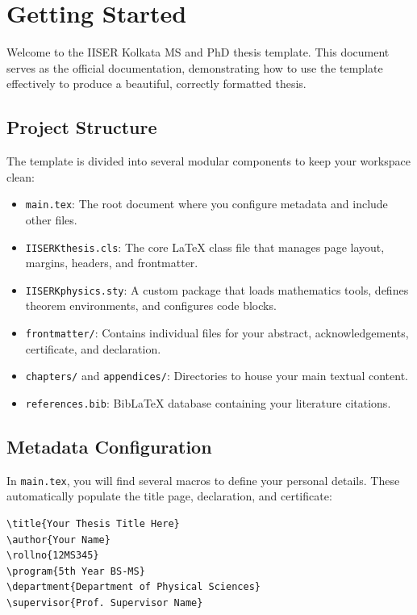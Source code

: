 \chapter{Getting Started}
\label{ch:getting_started}

Welcome to the IISER Kolkata MS and PhD thesis template. This document serves as the official documentation, demonstrating how to use the template effectively to produce a beautiful, correctly formatted thesis.

\section{Project Structure}
The template is divided into several modular components to keep your workspace clean:
\begin{itemize}
    \item \texttt{main.tex}: The root document where you configure metadata and include other files.
    \item \texttt{IISERKthesis.cls}: The core LaTeX class file that manages page layout, margins, headers, and frontmatter.
    \item \texttt{IISERKphysics.sty}: A custom package that loads mathematics tools, defines theorem environments, and configures code blocks.
    \item \texttt{frontmatter/}: Contains individual files for your abstract, acknowledgements, certificate, and declaration.
    \item \texttt{chapters/} and \texttt{appendices/}: Directories to house your main textual content.
    \item \texttt{references.bib}: BibLaTeX database containing your literature citations.
\end{itemize}

\section{Metadata Configuration}
In \texttt{main.tex}, you will find several macros to define your personal details. These automatically populate the title page, declaration, and certificate:
\begin{verbatim}
\title{Your Thesis Title Here}
\author{Your Name}
\rollno{12MS345}
\program{5th Year BS-MS}
\department{Department of Physical Sciences}
\supervisor{Prof. Supervisor Name}
\end{verbatim}

